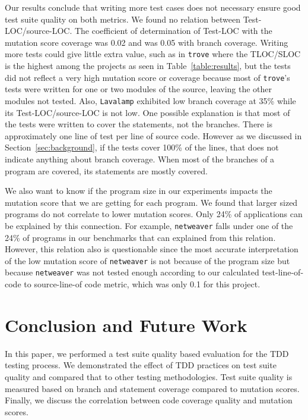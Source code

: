 \documentclass[conference]{IEEEtran}
\begin{document}
Our results conclude that writing more test cases does not necessary ensure good test suite quality on both metrics. We found no relation between Test-LOC/source-LOC. The coefficient of determination of Test-LOC with the mutation score coverage was 0.02 and was 0.05 with branch coverage. Writing more tests could give little extra value, such as in \texttt{trove} where the TLOC/SLOC is the highest among the projects as seen in Table~\ref{table:results}, but the tests did not reflect a very high mutation score or coverage because most of \texttt{trove}'s  tests were written for one or two modules of the source, leaving the other modules not tested.  Also, \texttt{Lavalamp} exhibited low branch coverage at 35\% while its Test-LOC/source-LOC is not low. One possible explanation is that most of the tests were written to cover the statements, not the branches.  There is approximately one line of test per line of source code. However as we discussed in Section~\ref{sec:background}, if the tests cover 100\% of the lines, that does not indicate anything about branch coverage. When most of the branches of a program are covered, its statements are mostly covered.

We also want to know if the program size in our experiments impacts the mutation score that we are getting for each program. We found that larger sized programs do not correlate  to lower mutation scores. Only 24\% of applications can be explained by this connection. For example, \texttt{netweaver} falls under one of the 24\% of programs in our benchmarks that can explained from this relation. However, this relation also is questionable since the most accurate interpretation of the low mutation score of \texttt{netweaver} is not because of the program size but because \texttt{netweaver} was not tested enough according to our calculated test-line-of-code to source-line-of code metric, which was only 0.1 for this project.

\section{Conclusion and Future Work}
In this paper, we performed a test suite quality based evaluation for the TDD testing process. We demonstrated the effect of TDD practices on test suite quality and compared that to other testing methodologies. Test suite quality is measured based on branch and statement coverage compared to mutation scores.  Finally, we discuss the correlation between code coverage quality and mutation scores.
\end{document}
